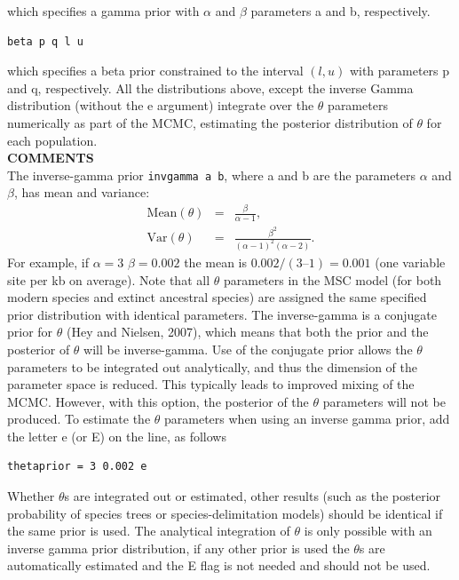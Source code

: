 \documentclass{book}
\numberwithin{equation}{section} \renewcommand{\baselinestretch}{0.55}
\begin{document}
which specifies a gamma prior with $\alpha$ and $\beta$ parameters a and b, respectively.
\begin{verbatim}
beta p q l u
\end{verbatim}
which specifies a beta prior constrained to the interval $(l,u)$ with parameters p and q, respectively.
All the distributions above, except the inverse Gamma distribution (without the e argument) integrate over the $\theta$
parameters numerically as part of the MCMC, estimating the posterior
distribution of $\theta$ for each population.
\vspace{5pt}\\
\textbf{COMMENTS} \vspace{5pt}\\
The inverse-gamma prior \texttt{invgamma a b}, where a and b are the parameters $\alpha$ and $\beta$,
has mean and variance:
\begin{eqnarray}
  \textrm{Mean}(\theta) & = & \frac{\beta}{\alpha - 1}, \nonumber \\
    \textrm{Var}(\theta) & = & \frac{\beta^2}{(\alpha - 1)^2 (\alpha - 2)}. \nonumber
\end{eqnarray}
For example, if
$\alpha=3$ $\beta=0.002$ the mean is $0.002/(3 – 1) = 0.001$ (one
variable site per kb on average).  Note that all $\theta$ parameters
in the MSC model (for both modern species and extinct ancestral
species) are assigned the same specified prior distribution with identical
parameters.  The inverse-gamma is a conjugate prior for $\theta$ (Hey
and Nielsen, 2007), which means that both the prior and the posterior
of $\theta$ will be inverse-gamma.  Use of the conjugate prior allows
the $\theta$ parameters to be integrated out analytically, and thus
the dimension of the parameter space is reduced.  This typically leads
to improved mixing of the MCMC.  However, with this option, the
posterior of the $\theta$ parameters will not be produced.  To
estimate the $\theta$ parameters when using an inverse gamma prior,
add the letter e (or E) on the line, as follows
\begin{verbatim}
thetaprior = 3 0.002 e
\end{verbatim}
Whether $\theta$s are integrated out or estimated, other results (such as the posterior 
probability of species trees or species-delimitation models) should be identical
if the same prior is used. The analytical integration of $\theta$ is only possible
with an inverse gamma prior distribution, if any other prior is used
the $\theta$s are automatically estimated and the E flag is not needed and should not be used.
\end{document}
